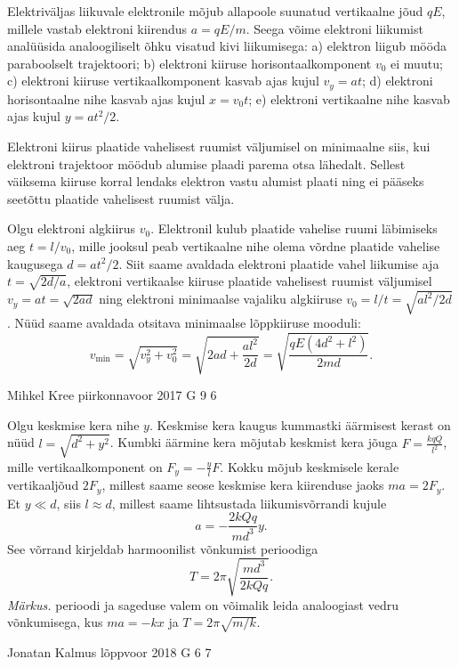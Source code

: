 \documentclass[11pt]{article}
\begin{document}
{{\ifSolution
Elektriväljas liikuvale elektronile mõjub allapoole suunatud vertikaalne jõud $qE$, millele vastab elektroni kiirendus $a=qE/m$. Seega võime elektroni liikumist analüüsida analoogiliselt õhku visatud kivi liikumisega: a) elektron liigub mööda paraboolselt trajektoori; b) elektroni kiiruse horisontaalkomponent $v_0$ ei muutu; c) elektroni kiiruse vertikaalkomponent kasvab ajas kujul $v_y=at$; d) elektroni horisontaalne nihe kasvab ajas kujul $x=v_0t$; e) elektroni vertikaalne nihe kasvab ajas kujul $y=at^2/2$.

Elektroni kiirus plaatide vahelisest ruumist väljumisel on minimaalne siis, kui elektroni trajektoor möödub alumise plaadi parema otsa lähedalt. Sellest väiksema kiiruse korral lendaks elektron vastu alumist plaati ning ei pääseks seetõttu plaatide vahelisest ruumist välja.

Olgu elektroni algkiirus $v_0$. Elektronil kulub plaatide vahelise ruumi läbimiseks aeg $t=l/v_0$, mille jooksul peab vertikaalne nihe olema võrdne plaatide vahelise kaugusega $d=at^2/2$. Siit saame avaldada elektroni plaatide vahel liikumise aja $t=\sqrt{2d/a}$, elektroni vertikaalse kiiruse plaatide vahelisest ruumist väljumisel $v_y=at=\sqrt{2ad}$ ning elektroni minimaalse vajaliku algkiiruse $v_0=l/t=\sqrt{al^2/2d}$. Nüüd saame avaldada otsitava minimaalse lõppkiiruse mooduli:
\[
v_\mathrm{min}=\sqrt{v_y^2+v_0^2}=\sqrt{2ad+\frac{al^2}{2d}}=\sqrt{\frac{qE\left(4d^2+l^2\right)}{2md}}.
\]
\fi
}

{Mihkel Kree} %
{piirkonnavoor} %
{2017} %
{G 9} %
{6} %
{

\ifSolution
Olgu keskmise kera nihe $y$. Keskmise kera kaugus kummastki äärmisest kerast on nüüd $l=\sqrt{d^2+y^2}$. Kumbki äärmine kera mõjutab keskmist kera jõuga $F=\frac{kqQ}{l^2}$, mille vertikaalkomponent on $F_y=-\frac{y}{l}F$. Kokku mõjub keskmisele kerale vertikaaljõud $2F_y$, millest saame seose keskmise kera kiirenduse jaoks $ma=2F_y$. Et $y\ll d$, siis $l\approx d$, millest saame lihtsustada liikumisvõrrandi kujule
\[
a=-\frac{2kQq}{md^3}y.
\]
See võrrand kirjeldab harmoonilist võnkumist perioodiga 
\[ T = 2\pi \sqrt{\frac{md^3}{2kQq}}.\]
{\em Märkus.} perioodi ja sageduse valem on võimalik leida analoogiast vedru võnkumisega, kus $ma = -kx$ ja $T=2\pi \sqrt{m/k}$.
\fi
}

{Jonatan Kalmus} %
{lõppvoor} %
{2018} %
{G 6} %
{7} %
{

}}
\end{document}
